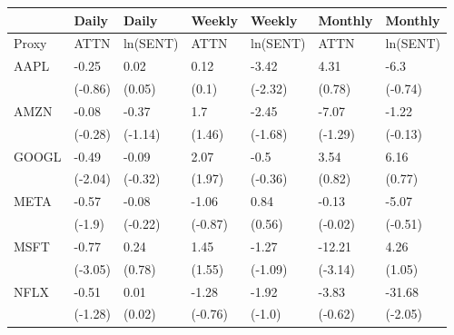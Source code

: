 \begin{tabular}{lllllll}
\toprule
{} &    Daily &     Daily &   Weekly &    Weekly &  Monthly &   Monthly \\
\midrule
Proxy &     ATTN &  ln(SENT) &     ATTN &  ln(SENT) &     ATTN &  ln(SENT) \\
AAPL  &    -0.25 &      0.02 &     0.12 &     -3.42 &     4.31 &      -6.3 \\
      &  (-0.86) &    (0.05) &    (0.1) &   (-2.32) &   (0.78) &   (-0.74) \\
AMZN  &    -0.08 &     -0.37 &      1.7 &     -2.45 &    -7.07 &     -1.22 \\
      &  (-0.28) &   (-1.14) &   (1.46) &   (-1.68) &  (-1.29) &   (-0.13) \\
GOOGL &    -0.49 &     -0.09 &     2.07 &      -0.5 &     3.54 &      6.16 \\
      &  (-2.04) &   (-0.32) &   (1.97) &   (-0.36) &   (0.82) &    (0.77) \\
META  &    -0.57 &     -0.08 &    -1.06 &      0.84 &    -0.13 &     -5.07 \\
      &   (-1.9) &   (-0.22) &  (-0.87) &    (0.56) &  (-0.02) &   (-0.51) \\
MSFT  &    -0.77 &      0.24 &     1.45 &     -1.27 &   -12.21 &      4.26 \\
      &  (-3.05) &    (0.78) &   (1.55) &   (-1.09) &  (-3.14) &    (1.05) \\
NFLX  &    -0.51 &      0.01 &    -1.28 &     -1.92 &    -3.83 &    -31.68 \\
      &  (-1.28) &    (0.02) &  (-0.76) &    (-1.0) &  (-0.62) &   (-2.05) \\
\bottomrule
\end{tabular}
